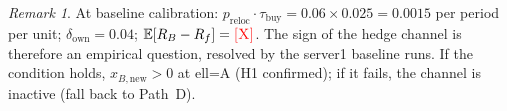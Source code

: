 \documentclass[12pt]{article}
\theoremstyle{definition}
\theoremstyle{remark}
\newtheorem{remark}{Remark}
\newcommand{\ph}[1]{\textcolor{red}{\textsc{[#1]}}}
\newcommand{\taubuy}{\tau_{\mathrm{buy}}}
\begin{document}
\begin{appendices}
\begin{remark}
At baseline calibration: $p_{\text{reloc}} \cdot \taubuy = 0.06 \times 0.025 =
0.0015$ per period per unit; $\delta_{\text{own}} = 0.04$;
$\mathbb{E}[R_B - R_f] = \ph{X}$.
The sign of the hedge channel is therefore an empirical question, resolved by
the server1 baseline runs.
If the condition holds, $x_{B,\text{new}} > 0$ at ell=A (H1 confirmed);
if it fails, the channel is inactive (fall back to Path~D).
\end{remark}

\end{appendices}

\end{document}
